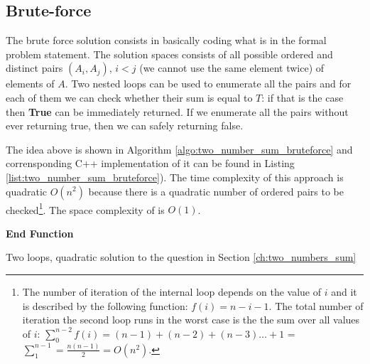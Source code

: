 \subsection{Brute-force}
\label{sec:two_numbers:bruteforce}
The brute force solution consists in basically coding what is in the formal problem statement.
The solution spaces consists of all possible ordered and
distinct pairs $(A_i,A_j)$, $i < j$ (we cannot use the same element twice) of elements of $A$.
Two nested loops can be used to enumerate all the pairs and for each of them we can check whether
their sum is equal to $T$: if that is the case then \textbf{True} can be immediately returned.
If we enumerate all the pairs without ever returning true, then we can safely returning false. 

The idea above is shown in Algorithm \ref{algo:two_number_sum_bruteforce} and corrensponding C++ implementation of it can be found in 
Listing \ref{list:two_number_sum_bruteforce}). 
The time complexity of this approach is quadratic $O(n^2)$ because there is a quadratic number of
ordered pairs to be checked\footnote{The number of iteration of the internal loop depends on the value of $i$ and
it is described by the following function: $f(i) = n-i-1$. The total number of iteration the second
loop runs in the worst case is the the sum over all values of $i$: $\sum_{0}^{n-2}f(i) = (n-1) +
(n-2) + (n-3) \dots + 1$ = $\sum_{1}^{n-1} = \frac{n(n-1)}{2} = O(n^2)$.}.
The space complexity of is $O(1)$.

\begin{algorithm}
	\SetAlgoLined {}
	
	 

	\textbf{End Function}
	\caption{Two loops, quadratic solution to the question in Section \ref{ch:two_numbers_sum} }
	\label{algo:two_number_sum_bruteforce}
\end{algorithm}

\begin{minipage}{\linewidth}
	
\end{minipage}


